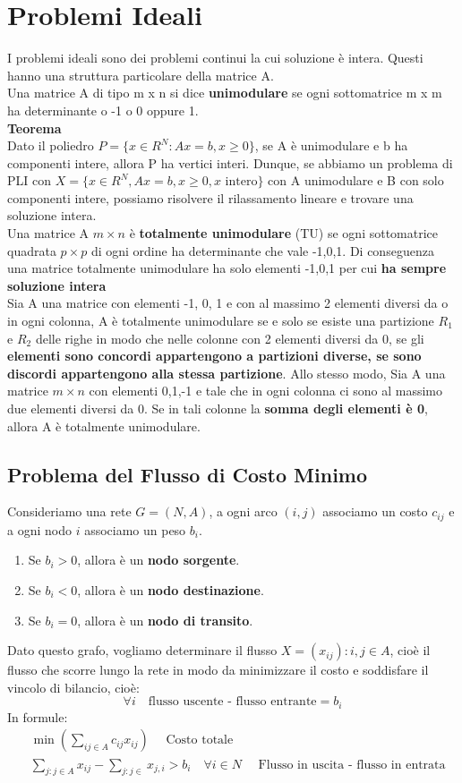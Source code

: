 \section{Problemi Ideali}
I problemi ideali sono dei problemi continui la cui soluzione è intera. Questi hanno una struttura particolare della matrice A.\\ 
Una matrice A di tipo m x n si dice \textbf{unimodulare} se ogni sottomatrice m x m ha determinante o -1 o 0 oppure 1. \\
\textbf{Teorema}\\
Dato il poliedro $P = \{ x \in R^N : Ax = b, x \geq 0 \}$, se A è unimodulare e b ha componenti intere, allora P ha vertici interi.
Dunque, se abbiamo un problema di PLI con $X = \{ x \in R^N, Ax = b, x \geq 0, x \text{ intero}\}$  con A unimodulare e B con solo componenti intere, possiamo risolvere il rilassamento lineare e trovare una soluzione intera.\\
Una matrice A $m \times n$ è \textbf{totalmente unimodulare} (TU) se ogni sottomatrice quadrata $p \times p$ di ogni ordine ha determinante che vale -1,0,1.
Di conseguenza una matrice totalmente unimodulare ha solo elementi -1,0,1 per cui \textbf{ha sempre soluzione intera}\\

Sia A una matrice con elementi -1, 0, 1 e con al massimo 2 elementi diversi da o in ogni colonna, A è totalmente unimodulare se e solo se esiste una partizione $R_1$ e $R_2$ delle righe in modo che nelle colonne con 2 elementi diversi da 0, se gli \textbf{elementi sono concordi appartengono a partizioni diverse, se sono discordi appartengono alla stessa partizione}.
Allo stesso modo, Sia A una matrice $m \times n$ con elementi 0,1,-1 e tale che in ogni colonna ci sono al massimo due elementi diversi da 0. Se in tali colonne la \textbf{somma degli elementi è 0}, allora A è totalmente unimodulare.
\subsection{Problema del Flusso di Costo Minimo}
Consideriamo una rete $G=(N,A)$, a ogni arco $(i,j)$ associamo un costo $c_{ij}$ e a ogni nodo $i$ associamo un peso $b_i$.
\begin{enumerate}
    \item Se $b_i > 0$, allora è un \textbf{nodo sorgente}.
    \item Se $b_i < 0$, allora è un \textbf{nodo destinazione}.
    \item Se $b_i = 0$, allora è un \textbf{nodo di transito}.
\end{enumerate}
Dato questo grafo, vogliamo determinare il flusso $X=(x_{ij}) : i,j \in A$, cioè il flusso che scorre lungo la rete in modo da minimizzare il costo e soddisfare il vincolo di bilancio, cioè: 
\[\forall i \quad \text{flusso uscente - flusso entrante} = b_i\]
In formule: 
\begin{align*}
    &\min (\sum_{ij \in A} c_{ij}x_{ij})\quad \text{ Costo totale}\\
    &\sum_{j : j \in A} x_{ij} - \sum_{j: j \in} x_{j, i} > b_i \quad \forall i \in N \quad \text{ Flusso in uscita - flusso in entrata}
\end{align*}

